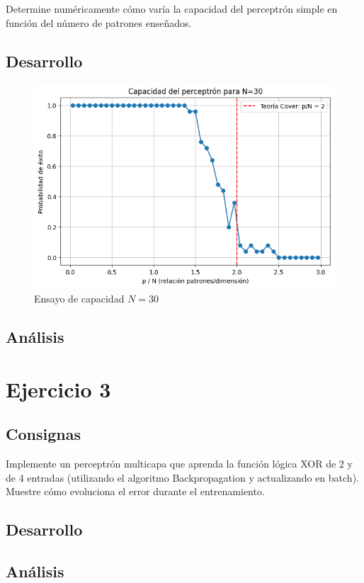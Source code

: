 \documentclass[11pt]{article} %
\begin{document}
Determine numéricamente cómo varía la capacidad del perceptrón simple en función del número de patrones enseñados.


\subsection{Desarrollo}


\begin{figure}[h!]
	\centering
	\includegraphics[width=0.7\linewidth]{../imgs/ej2/capacidad}
	\caption[]{Ensayo de capacidad $N=30$}
	\label{fig:capacidad}
\end{figure}


\subsection{Análisis}

\section{Ejercicio 3}

\subsection{Consignas}

Implemente un perceptrón multicapa que aprenda la función lógica XOR de 2 y de 4 entradas (utilizando el algoritmo Backpropagation y actualizando en batch). Muestre cómo evoluciona el error durante el entrenamiento.

\subsection{Desarrollo}

\subsection{Análisis}
\end{document}

